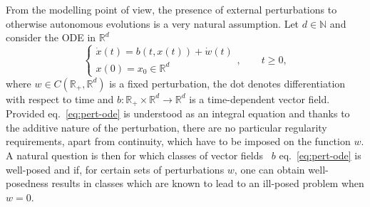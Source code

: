 \documentclass[10pt]{article}
\begin{document}
From the modelling point of view, the presence of external perturbations to
otherwise autonomous evolutions is a very natural assumption. Let $d \in
\mathbb{N}$ and consider the ODE in $\mathbb{R}^d$
\begin{equation}
  \left\{\begin{array}{l}
    \dot{x} (t) = b (t, x (t)) + \dot{w} (t)\\
    x (0) = x_0 \in \mathbb{R}^d
  \end{array}\right., \qquad t \geqslant 0, \label{eq:pert-ode}
\end{equation}
where $w \in C (\mathbb{R}_+, \mathbb{R}^d)$ is a fixed perturbation, the dot
denotes differentiation with respect to time and $b : \mathbb{R}_+ \times
\mathbb{R}^d \rightarrow \mathbb{R}^d$ is a time-dependent vector field.
Provided eq.~{\eqref{eq:pert-ode}} is understood as an integral equation and
thanks to the additive nature of the perturbation, there are no particular
regularity requirements, apart from continuity, which have to be imposed on
the function $w$. A natural question is then for which classes of vector
fields \ $b$ eq.~{\eqref{eq:pert-ode}} is well-posed and if, for certain sets
of perturbations $w$, one can obtain well-posedness results in classes which
are known to lead to an ill-posed problem when $w = 0$.

\
\end{document}
